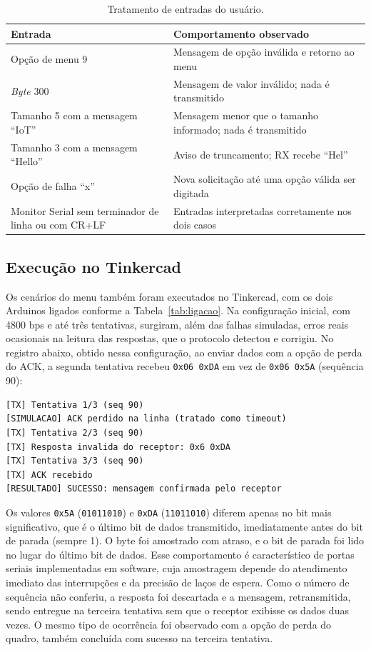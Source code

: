\documentclass[12pt]{article}
\begin{document}
\begin{table}[!htb]
\centering
\caption{Tratamento de entradas do usuário.}
\label{tab:entradas}
\small
\begin{tabularx}{\linewidth}{LL}
\toprule
\textbf{Entrada} & \textbf{Comportamento observado} \\
\midrule
Opção de menu 9 & Mensagem de opção inválida e retorno ao menu \\
\emph{Byte} 300 & Mensagem de valor inválido; nada é transmitido \\
Tamanho 5 com a mensagem ``IoT'' & Mensagem menor que o tamanho informado; nada é transmitido \\
Tamanho 3 com a mensagem ``Hello'' & Aviso de truncamento; RX recebe ``Hel'' \\
Opção de falha ``x'' & Nova solicitação até uma opção válida ser digitada \\
Monitor Serial sem terminador de linha ou com CR+LF & Entradas interpretadas corretamente nos dois casos \\
\bottomrule
\end{tabularx}
\end{table}

\subsection*{Execução no Tinkercad}

Os cenários do menu também foram executados no Tinkercad, com os dois Arduinos ligados conforme a Tabela~\ref{tab:ligacao}. Na configuração inicial, com 4800 bps e até três tentativas, surgiram, além das falhas simuladas, erros reais ocasionais na leitura das respostas, que o protocolo detectou e corrigiu. No registro abaixo, obtido nessa configuração, ao enviar dados com a opção de perda do ACK, a segunda tentativa recebeu \texttt{0x06 0xDA} em vez de \texttt{0x06 0x5A} (sequência 90):

\begin{small}
\begin{verbatim}
[TX] Tentativa 1/3 (seq 90)
[SIMULACAO] ACK perdido na linha (tratado como timeout)
[TX] Tentativa 2/3 (seq 90)
[TX] Resposta invalida do receptor: 0x6 0xDA
[TX] Tentativa 3/3 (seq 90)
[TX] ACK recebido
[RESULTADO] SUCESSO: mensagem confirmada pelo receptor
\end{verbatim}
\end{small}

Os valores \texttt{0x5A} (\texttt{01011010}) e \texttt{0xDA} (\texttt{11011010}) diferem apenas no bit mais significativo, que é o último bit de dados transmitido, imediatamente antes do bit de parada (sempre 1). O byte foi amostrado com atraso, e o bit de parada foi lido no lugar do último bit de dados. Esse comportamento é característico de portas seriais implementadas em software, cuja amostragem depende do atendimento imediato das interrupções e da precisão de laços de espera. Como o número de sequência não conferiu, a resposta foi descartada e a mensagem, retransmitida, sendo entregue na terceira tentativa sem que o receptor exibisse os dados duas vezes. O mesmo tipo de ocorrência foi observado com a opção de perda do quadro, também concluída com sucesso na terceira tentativa.
\end{document}
